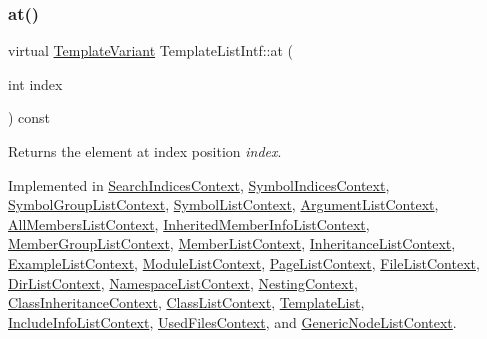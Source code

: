 \subsubsection{\texorpdfstring{at()}{at()}}
{\footnotesize\ttfamily virtual \mbox{\hyperlink{class_template_variant}{Template\+Variant}} Template\+List\+Intf\+::at (\begin{DoxyParamCaption}\item[{int}]{index }\end{DoxyParamCaption}) const\hspace{0.3cm}{\ttfamily [pure virtual]}}

Returns the element at index position {\itshape index}. 

Implemented in \mbox{\hyperlink{class_search_indices_context_a01954b6da883d9274840295905a999c8}{Search\+Indices\+Context}}, \mbox{\hyperlink{class_symbol_indices_context_a246d9d512a0daa50f0cdd0c2abfb86af}{Symbol\+Indices\+Context}}, \mbox{\hyperlink{class_symbol_group_list_context_aec1ee26a6f7899e37ba0b70c1ca5b744}{Symbol\+Group\+List\+Context}}, \mbox{\hyperlink{class_symbol_list_context_ac77916a7663380ea98b505a0892a3abc}{Symbol\+List\+Context}}, \mbox{\hyperlink{class_argument_list_context_ac3c4acdd80cab2fcbd53eed215034fe1}{Argument\+List\+Context}}, \mbox{\hyperlink{class_all_members_list_context_a0dc11cc3fddb12437e37fd350e94bd72}{All\+Members\+List\+Context}}, \mbox{\hyperlink{class_inherited_member_info_list_context_aae1d20b1cb3ca2e5e5dfa9b13b734d79}{Inherited\+Member\+Info\+List\+Context}}, \mbox{\hyperlink{class_member_group_list_context_a804c6afa443fa52659d4f19413f329bf}{Member\+Group\+List\+Context}}, \mbox{\hyperlink{class_member_list_context_a89dbead5ee65a69041998b3f58a9cf30}{Member\+List\+Context}}, \mbox{\hyperlink{class_inheritance_list_context_a789d4875a82da88a35263a80c1043890}{Inheritance\+List\+Context}}, \mbox{\hyperlink{class_example_list_context_ac661f44438dbb4b2b36ad219c9da6feb}{Example\+List\+Context}}, \mbox{\hyperlink{class_module_list_context_a4548860492524e01ee703bd613fd08a7}{Module\+List\+Context}}, \mbox{\hyperlink{class_page_list_context_adb8538bc8c1206e15372209d7e3379dc}{Page\+List\+Context}}, \mbox{\hyperlink{class_file_list_context_ab0a889fd2011e3fbafc3271cd1d4c20f}{File\+List\+Context}}, \mbox{\hyperlink{class_dir_list_context_a945ceb92b9e8b4f8a825f283d577eef0}{Dir\+List\+Context}}, \mbox{\hyperlink{class_namespace_list_context_aad786580251baade29f06a76612201cd}{Namespace\+List\+Context}}, \mbox{\hyperlink{class_nesting_context_a11ff5ba22637b6ce76883c3cb840e67b}{Nesting\+Context}}, \mbox{\hyperlink{class_class_inheritance_context_ad824ec079b4dc94d2b5b3e6a0e60984a}{Class\+Inheritance\+Context}}, \mbox{\hyperlink{class_class_list_context_a2ff974cf1cd295c866035d255bbb8b36}{Class\+List\+Context}}, \mbox{\hyperlink{class_template_list_a9fffa09b83138d64bbe66b32e2a3d283}{Template\+List}}, \mbox{\hyperlink{class_include_info_list_context_abdbdfb96f30dc9a64e42e01154fd30ff}{Include\+Info\+List\+Context}}, \mbox{\hyperlink{class_used_files_context_a635972ef6dd5be8afd3b6c069c413dde}{Used\+Files\+Context}}, and \mbox{\hyperlink{class_generic_node_list_context_aa7d149964207236258937b46c4125cc7}{Generic\+Node\+List\+Context}}.

